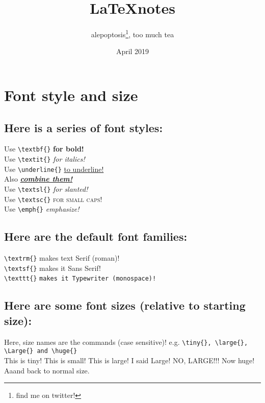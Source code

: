 \documentclass[12pt, letterpaper]{article} %
\title{\LaTeX notes} %
\author{alepoptosis\thanks{find me on twitter!}, too much tea}
\date{April 2019} %
\begin{document}

\maketitle %

\section{Font style and size}

\subsection*{Here is a series of font styles:}

Use \verb+\textbf{}+ \textbf{for bold!} \\
Use \verb+\textit{}+ \textit{for italics!} \\
Use \verb+\underline{}+ \underline{to underline!} \\
Also \textbf{\textit{\underline{combine them!}}} \\
Use \verb+\textsl{}+ \textsl{for slanted!} \\
Use \verb+\textsc{}+ \textsc{for small caps!} \\
Use \verb+\emph{}+ \emph{emphasize!} %

\subsection*{Here are the default font families:}

\verb+\textrm{}+ \textrm{makes text Serif (roman)!} \\
\verb+\textsf{}+ \textsf{makes it Sans Serif!} \\
\verb+\texttt{}+ \texttt{makes it Typewriter (monospace)!} 

\subsection*{Here are some font sizes (relative to starting size):} 
Here, size names are the commands (case sensitive)! e.g. 
\verb+\tiny{}, \large{}, \Large{} and \huge{}+\\

\tiny{This is tiny!}
\small{This is small!}
\large{This is large!}
\Large{I said Large!}
\LARGE{NO, LARGE!!!}
\huge{Now huge!}
\normalsize{Aaand back to normal size.}
\end{document}
